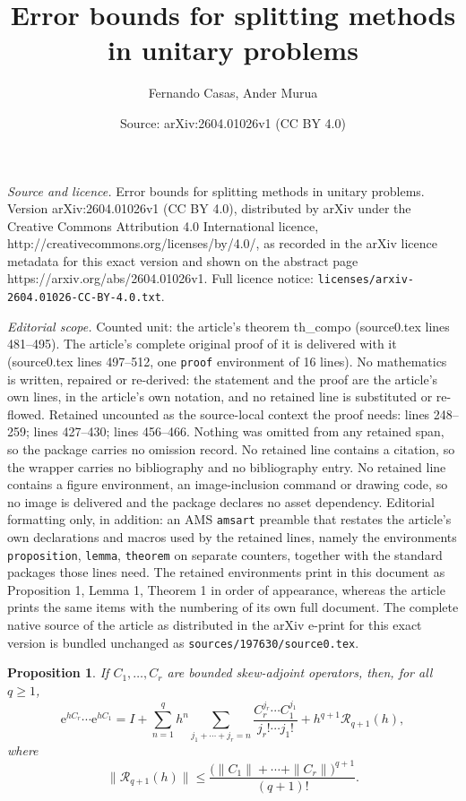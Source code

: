 \documentclass[10pt,a4paper]{amsart}
\title{Error bounds for splitting methods in unitary problems}
\author{Fernando Casas, Ander Murua}
\date{Source: arXiv:2604.01026v1 (CC BY 4.0)}
\newtheorem{proposition}{Proposition}
\begin{document}
\maketitle

\noindent\emph{Source and licence.} Error bounds for splitting methods in unitary problems. Version arXiv:2604.01026v1 (CC BY 4.0), distributed by arXiv under the Creative Commons Attribution 4.0 International licence, http://creativecommons.org/licenses/by/4.0/, as recorded in the arXiv licence metadata for this exact version and shown on the abstract page https://arxiv.org/abs/2604.01026v1. Full licence notice: \texttt{licenses/arxiv-2604.01026-CC-BY-4.0.txt}.\par\smallskip

\noindent\textit{Editorial scope.} Counted unit: the article's theorem th\_compo (source0.tex lines 481--495). The article's complete original proof of it is delivered with it (source0.tex lines 497--512, one \texttt{proof} environment of 16 lines). No mathematics is written, repaired or re-derived: the statement and the proof are the article's own lines, in the article's own notation, and no retained line is substituted or re-flowed.  Retained uncounted as the source-local context the proof needs: lines 248--259; lines 427--430; lines 456--466.  Nothing was omitted from any retained span, so the package carries no omission record.  No retained line contains a citation, so the wrapper carries no bibliography and no bibliography entry.  No retained line contains a figure environment, an image-inclusion command or drawing code, so no image is delivered and the package declares no asset dependency.  Editorial formatting only, in addition: an AMS \texttt{amsart} preamble that restates the article's own declarations and macros used by the retained lines, namely the environments \texttt{proposition}, \texttt{lemma}, \texttt{theorem} on separate counters, together with the standard packages those lines need.  The retained environments print in this document as Proposition 1, Lemma 1, Theorem 1 in order of appearance, whereas the article prints the same items with the numbering of its own full document.  The complete native source of the article as distributed in the arXiv e-print for this exact version is bundled unchanged as \texttt{sources/197630/source0.tex}.
\begin{proposition}
\label{p:boundsB}
If $C_1, \ldots, C_r$ are bounded skew-adjoint operators, then, for all $q \geq 1$,
\begin{equation}
\label{eq:expB2}
\mathrm{e}^{h C_r} \cdots \mathrm{e}^{h C_1} = I + \sum_{n=1}^{q} h^n \sum_{j_1+\cdots+j_r = n} \frac{C_r^{j_r} \cdots C_1^{j_1}}{j_r! \cdots j_1!} + h^{q+1} \mathcal{R}_{q+1}(h),
\end{equation}
where
\begin{equation*}
\|\mathcal{R}_{q+1}(h)\| \leq \frac{\big(\|C_1\| + \cdots + \|C_r\| \big)^{q+1}}{(q+1)!}.
\end{equation*}
\end{proposition}
\end{document}

